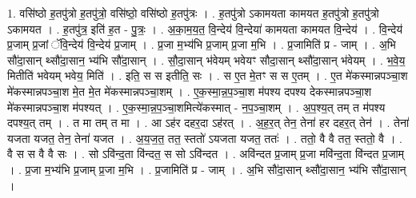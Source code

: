 \documentclass[17pt]{extarticle}
\begin{document}
1. वसि॑ष्ठो ह॒तपु॑त्रो ह॒तपु॑त्रो॒ वसि॑ष्ठो॒ वसि॑ष्ठो ह॒तपु॑त्रः । . ह॒तपु॑त्रो ऽकामयता कामयत ह॒तपु॑त्रो ह॒तपु॑त्रो ऽकामयत । . ह॒तपु॑त्र॒ इति॑ ह॒त - पु॒त्रः॒ । . अ॒का॒म॒य॒त॒ वि॒न्देय॑ वि॒न्देया॑ कामयता कामयत वि॒न्देय॑ । . वि॒न्देय॑ प्र॒जाम् प्र॒जां ॅवि॒न्देय॑ वि॒न्देय॑ प्र॒जाम् । . प्र॒जा म॒भ्य॑भि प्र॒जाम् प्र॒जा म॒भि । . प्र॒जामिति॑ प्र - जाम् । . अ॒भि सौ॑दा॒सान् थ्सौ॑दा॒सान॒ भ्य॑भि सौ॑दा॒सान् । . सौ॒दा॒सान् भ॑वेयम् भवेयꣳ सौदा॒सान् थ्सौ॑दा॒सान् भ॑वेयम् । . भ॒वे॒य॒ मितीति॑ भवेयम् भवेय॒ मिति॑ । . इति॒ स स इतीति॒ सः । . स ए॒त मे॒तꣳ स स ए॒तम् । . ए॒त मे॑कस्मान्नपञ्चा॒श मे॑कस्मान्नपञ्चा॒श मे॒त मे॒त मे॑कस्मान्नपञ्चा॒शम् । . ए॒क॒स्मा॒न्न॒प॒ञ्चा॒श म॑पश्य दपश्य देकस्मान्नपञ्चा॒श मे॑कस्मान्नपञ्चा॒श म॑पश्यत् । . ए॒क॒स्मा॒न्न॒प॒ञ्चा॒शमित्ये॑कस्मात् - न॒प॒ञ्चा॒शम् । . अ॒प॒श्य॒त् तम् त म॑पश्य दपश्य॒त् तम् । . त मा तम् त मा । . आ ऽह॑र दहर॒दा ऽह॑रत् । . अ॒ह॒र॒त् तेन॒ तेना॑ हर दहर॒त् तेन॑ । . तेना॑ यजता यजत॒ तेन॒ तेना॑ यजत । . अ॒य॒ज॒त॒ तत॒ स्ततो॑ ऽयजता यजत॒ ततः॑ । . ततो॒ वै वै तत॒ स्ततो॒ वै । . वै स स वै वै सः । . सो ऽवि॑न्द॒ता वि॑न्दत॒ स सो ऽवि॑न्दत । . अवि॑न्दत प्र॒जाम् प्र॒जा मवि॑न्द॒ता वि॑न्दत प्र॒जाम् । . प्र॒जा म॒भ्य॑भि प्र॒जाम् प्र॒जा म॒भि । . प्र॒जामिति॑ प्र - जाम् । . अ॒भि सौ॑दा॒सान् थ्सौ॑दा॒सान॒ भ्य॑भि सौ॑दा॒सान् । \newline
\end{document}
